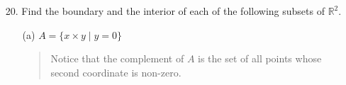 \documentclass[12pt, a4paper]{article}
\newcommand{\reals}{\mathbb{R}} %
\begin{document}
\begin{itemize}
\item[]
\item[]

\item[20.]
Find the boundary and the interior of each of the following subsets of $\reals^2$.
\begin{itemize}
\item[(a)]
$A = \{x \times y \mid y = 0\}$
\begin{quote}
Notice that the complement of $A$ is the set of all points
whose second coordinate is non-zero.
\end{quote}
\end{itemize}
\end{itemize}
\end{document}
